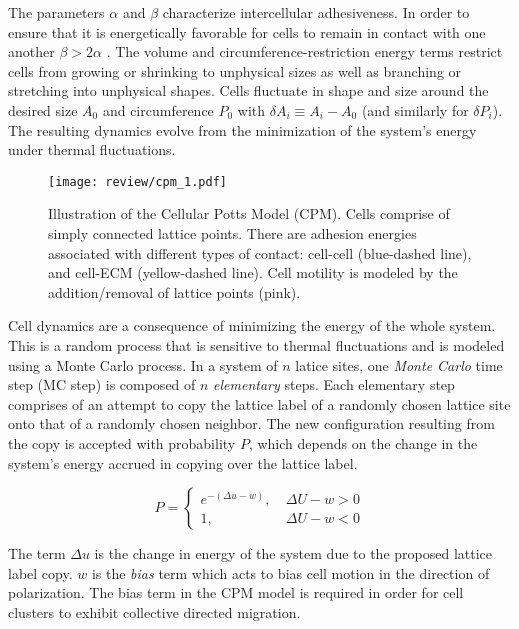 \documentclass[a4paper]{article}
\begin{document}
The parameters $\alpha$ and $\beta$ characterize intercellular adhesiveness. In order to ensure that it is energetically favorable for cells to remain in contact with one another $\beta > 2\alpha$ \cite{szabo2010collective}. The volume and circumference-restriction energy terms restrict cells from growing or shrinking to unphysical sizes as well as branching or stretching into unphysical shapes. Cells fluctuate in shape and size around the desired size $A_0$ and circumference $P_0$ with $\delta A_i \equiv A_i-A_0$ (and similarly for $\delta P_i$). The resulting dynamics evolve from the minimization of the system’s energy under thermal fluctuations.

\begin{figure}
    \centering
        \texttt{[image: review/cpm\_1.pdf]}
    \caption{Illustration of the Cellular Potts Model (CPM). Cells comprise of simply connected lattice points. There are adhesion energies associated with different types of contact: cell-cell (blue-dashed line), and cell-ECM (yellow-dashed line). Cell motility is modeled by the addition/removal of lattice points (pink).} \label{fig:CPM1}
\end{figure}

Cell dynamics are a consequence of minimizing the energy of the whole system. This is a random process that is sensitive to thermal fluctuations and is modeled using a Monte Carlo process. In a system of $n$ latice sites, one \textit{Monte Carlo} time step (MC step) is composed of $n$ \textit{elementary} steps. Each elementary step comprises of an attempt to copy the lattice label of a randomly chosen lattice site onto that of a randomly chosen neighbor. The new configuration resulting from the copy is accepted with probability $P$, which depends on the change in the system's energy accrued in copying over the lattice label.

\begin{equation}
    P =
    \begin{cases}
        e^{-\left( \Delta u - w \right)}, &\ \Delta U - w > 0 \\
        1, &\ \Delta U - w < 0
    \end{cases}
\end{equation}

The term $\Delta u$ is the change in energy of the system due to the proposed lattice label copy. $w$ is the \textit{bias} term which acts to bias cell motion in the direction of polarization. The bias term in the CPM model is required in order for cell clusters to exhibit collective directed migration.
\end{document}
